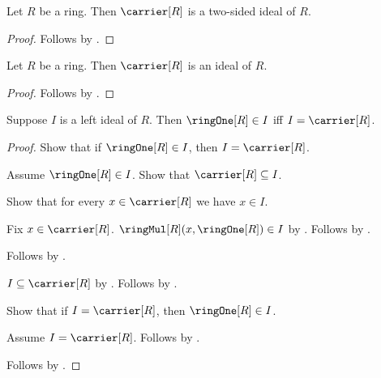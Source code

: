 \begin{theorem}\label{unit_is_two_sided_ideal}
    Let $R$ be a ring.
    Then $\carrier[R]$ is a two-sided ideal of $R$.
\end{theorem}
\begin{proof}
    Follows by
        .
\end{proof}

\begin{corollary}\label{unit_is_ideal}
    Let $R$ be a ring.
    Then $\carrier[R]$ is an ideal of $R$.
\end{corollary}
\begin{proof}
    Follows by .
\end{proof}

\begin{theorem}\label{left_ideal_contains_one_iff_full}
    Suppose $I$ is a left ideal of $R$.
    Then $\ringOne[R]\in I$ iff $I=\carrier[R]$.
\end{theorem}
\begin{proof}
    Show that if $\ringOne[R]\in I$, then $I=\carrier[R]$.
    \begin{subproof}
        Assume $\ringOne[R]\in I$.
        Show that $\carrier[R]\subseteq I$.
        \begin{subproof}
            Show that for every $x\in\carrier[R]$ we have $x\in I$.
            \begin{subproof}
                Fix $x\in\carrier[R]$.
                $\ringMul[R](x,\ringOne[R])\in I$ by
                    .
                Follows by .
            \end{subproof}
            Follows by .
        \end{subproof}
        $I\subseteq\carrier[R]$ by
            .
        Follows by .
    \end{subproof}
    Show that if $I=\carrier[R]$, then $\ringOne[R]\in I$.
    \begin{subproof}
        Assume $I=\carrier[R]$.
        Follows by .
    \end{subproof}
    Follows by \auto.
\end{proof}

